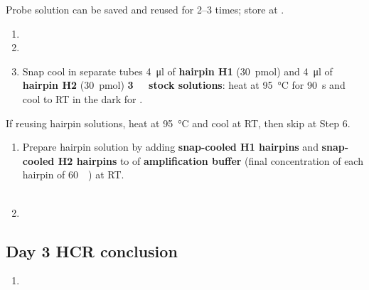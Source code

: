 \documentclass[10pt]{report}
\begin{document}
\bigskip\alert{Probe solution can be saved and reused for 2--3 times; store at \minustwenty.}

\begin{enumerate}[resume = steps]
	\item {}
	\item {}
	\item Snap cool in separate tubes \qty{4}{\ul} of \textbf{hairpin H1} (\qty{30}{\pmol}) and \qty{4}{\ul} of \textbf{hairpin H2} (\qty{30}{\pmol}) \textbf{\qty{3}{\micro\molar} stock solutions}: heat at \qty{95}{\degreeCelsius} for \qty{90}{\s} and cool to RT in the dark for \halfhour.
\end{enumerate}

\bigskip\alert{If reusing hairpin solutions, heat at \qty{95}{\degreeCelsius} and cool at RT, then skip at Step 6.}

\begin{enumerate}[resume = steps]
	\item Prepare hairpin solution by adding \textbf{snap-cooled H1 hairpins} and \textbf{snap-cooled H2 hairpins} to \twohunmicrol{} of \textbf{amplification buffer} (final concentration of each hairpin of \qty{60}{\nano\molar}) at RT.\\
	      \\
	\item {}
\end{enumerate}

\subsection*{Day 3 \textendash{} HCR conclusion}

\begin{enumerate}[series = steps]
	\item {}
\end{enumerate}
\end{document}
